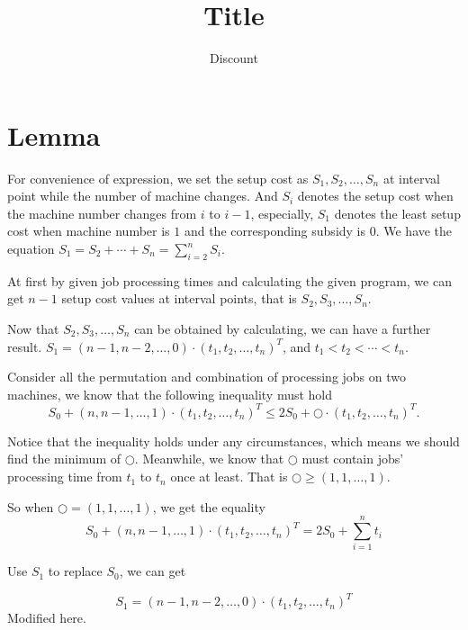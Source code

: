 \documentclass[UTF8]{article}
\title{Title}
\author{Discount}
\date{}
\begin{document}
\maketitle{}

\section{Lemma}

\quad For convenience of expression, we set the setup cost as $S_{1},S_{2}, \dots ,S_{n}$ at interval point while the number of machine changes.
And $S_{i}$ denotes the setup cost when the machine number changes from $i$ to $i-1$, especially, $S_{1}$ denotes the least setup cost when machine number is $1$ and the corresponding subsidy is $0$.
We have the equation $S_{1}=S_{2}+\cdots+S_{n}=\sum_{i=2}^n S_i$.

At first by given job processing times and calculating the given program, we can get $n-1$ setup cost values at interval points, that is $S_2,S_3,\dots,S_n$.

Now that $S_2,S_3,\dots,S_n$ can be obtained by calculating, we can have a further result. $S_{1}=(n-1,n-2,\dots,0) \cdot (t_1,t_2,\dots,t_n)^T $, and $ t_1<t_2<\cdots<t_n$.

Consider all the permutation and combination of processing jobs on two machines, we know that the following inequality must hold
\begin{equation*}
S_0+(n,n-1,\dots,1)\cdot(t_1,t_2,\dots,t_n)^T \leq
2S_0+ \bigcirc \cdot (t_1,t_2,\dots,t_n)^T.
\end{equation*}



Notice that the inequality holds under any circumstances, which means we should find the minimum of $\bigcirc$.  Meanwhile, we know that $\bigcirc$ must contain jobs' processing time from $t_1$ to $t_n$ once at least. That is $\bigcirc \geq (1,1,\dots,1)$.

So when $\bigcirc = (1,1,\dots,1)$, we get the equality
\begin{equation}
    S_0+(n,n-1,\dots,1) \cdot (t_1,t_2,\dots,t_n)^T= 2S_0+\sum_{i=1}^n t_i
\end{equation}

\qquad  Use $S_1$ to replace $S_0$, we can get

\begin{equation}
  S_{1}=(n-1,n-2,\dots,0) \cdot (t_1,t_2,\dots,t_n)^T
\end{equation}
Modified here.
\end{document}

